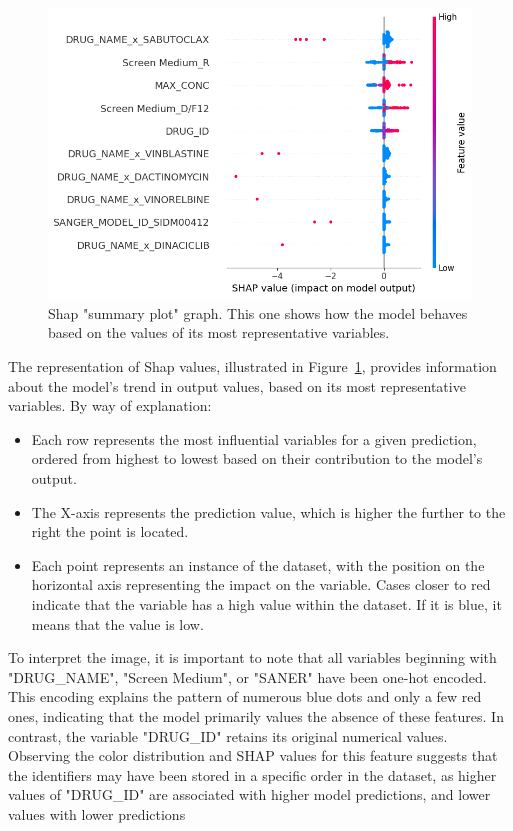 \begin{figure}[H]
    \centering
    \includegraphics[width=1\textwidth]{figures/shap_values.png}
    \caption{Shap "summary plot" graph. This one shows how the model behaves based on the values of its most representative variables.}
    \label{fig:shap_values}
\end{figure}

The representation of Shap values, illustrated in Figure~\ref{fig:shap_values}, provides information about the model's trend in output values, based on its most representative variables. By way of explanation:

\begin{itemize}
    \item Each row represents the most influential variables for a given prediction, ordered from highest to lowest based on their contribution to the model's output.
    \item The X-axis represents the prediction value, which is higher the further to the right the point is located.
    \item Each point represents an instance of the dataset, with the position on the horizontal axis representing the impact on the variable. Cases closer to red indicate that the variable has a high value within the dataset. If it is blue, it means that the value is low.
\end{itemize}

To interpret the image, it is important to note that all variables beginning with "DRUG\_NAME", "Screen Medium", or "SANER" have been one-hot encoded. This encoding explains the pattern of numerous blue dots and only a few red ones, indicating that the model primarily values the absence of these features. In contrast, the variable "DRUG\_ID" retains its original numerical values. Observing the color distribution and SHAP values for this feature suggests that the identifiers may have been stored in a specific order in the dataset, as higher values of "DRUG\_ID" are associated with higher model predictions, and lower values with lower predictions

